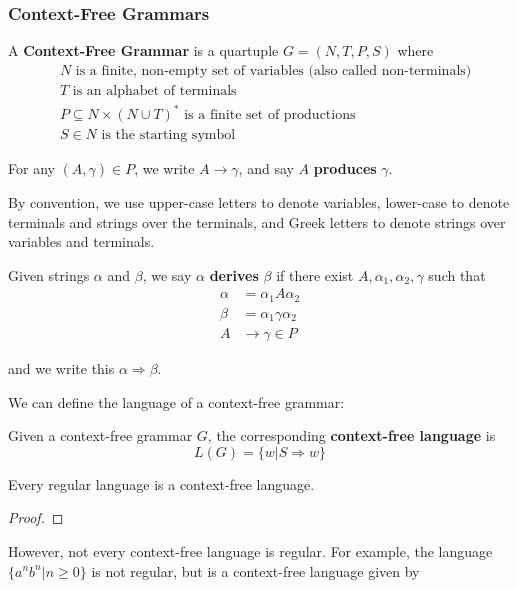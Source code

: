 \subsubsection{Context-Free Grammars}\label{subsec:context-free-grammars}
\begin{definition}
    A \textbf{Context-Free Grammar} is a quartuple \(G=(N, T, P, S)\) where 
          \begin{align*}
                & N\text{ is a finite, non-empty set of variables (also called non-terminals)}\\
                & T\text{ is an alphabet of terminals}\\
                & P\subseteq N\times{(N\cup T)}^*\text{ is a finite set of productions}\\
                & S\in N\text{ is the starting symbol}
          \end{align*}

          For any \((A, \gamma)\in P\), we write \(A\to\gamma \), and say \(A\) \textbf{produces} \(\gamma \). 
\end{definition}

By convention, we use upper-case letters to denote variables, lower-case to denote terminals and strings over the terminals, and Greek letters to denote strings over variables and terminals.

\begin{definition}
    Given strings \(\alpha \) and \(\beta \), we say \(\alpha \) \textbf{derives} \(\beta \) if there exist \(A, \alpha_1,\alpha_2,\gamma \) such that 
    \begin{align*}
          \alpha &= \alpha_1A\alpha_2\\
          \beta  &= \alpha_1\gamma\alpha_2\\
          A&\to \gamma\in P
    \end{align*}

    and we write this \(\alpha\Rightarrow\beta \). 
\end{definition}

We can define the language of a context-free grammar:

\begin{definition}
      Given a context-free grammar \(G\), the corresponding \textbf{context-free language} is \[L(G)=\{w|S\Rightarrow w\} \]
\end{definition}

\begin{theorem}
      Every regular language is a context-free language. 
\end{theorem}

\begin{proof}

\end{proof}

However, not every context-free language is regular. For example, the language \( \{a^n b^n|n\geq0\} \) is not regular, but is a context-free language given by